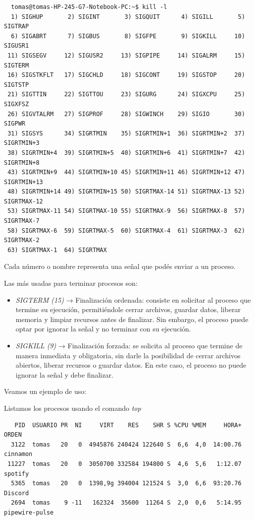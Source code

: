 \documentclass{article}
\begin{document}
\begin{commandline}
 {
\begin{verbatim}
  tomas@tomas-HP-245-G7-Notebook-PC:~$ kill -l
  1) SIGHUP       2) SIGINT       3) SIGQUIT      4) SIGILL       5) SIGTRAP 
  6) SIGABRT      7) SIGBUS       8) SIGFPE       9) SIGKILL     10) SIGUSR1
 11) SIGSEGV     12) SIGUSR2     13) SIGPIPE     14) SIGALRM     15) SIGTERM
 16) SIGSTKFLT   17) SIGCHLD     18) SIGCONT     19) SIGSTOP     20) SIGTSTP
 21) SIGTTIN     22) SIGTTOU     23) SIGURG      24) SIGXCPU     25) SIGXFSZ
 26) SIGVTALRM   27) SIGPROF     28) SIGWINCH    29) SIGIO       30) SIGPWR   
 31) SIGSYS      34) SIGRTMIN    35) SIGRTMIN+1  36) SIGRTMIN+2  37) SIGRTMIN+3 
 38) SIGRTMIN+4  39) SIGRTMIN+5  40) SIGRTMIN+6  41) SIGRTMIN+7  42) SIGRTMIN+8 
 43) SIGRTMIN+9  44) SIGRTMIN+10 45) SIGRTMIN+11 46) SIGRTMIN+12 47) SIGRTMIN+13 
 48) SIGRTMIN+14 49) SIGRTMIN+15 50) SIGRTMAX-14 51) SIGRTMAX-13 52) SIGRTMAX-12 
 53) SIGRTMAX-11 54) SIGRTMAX-10 55) SIGRTMAX-9  56) SIGRTMAX-8  57) SIGRTMAX-7 
 58) SIGRTMAX-6  59) SIGRTMAX-5  60) SIGRTMAX-4  61) SIGRTMAX-3  62) SIGRTMAX-2 
 63) SIGRTMAX-1  64) SIGRTMAX
\end{verbatim}
}
\end{commandline}

\noindent
Cada número o nombre representa una señal que podés enviar a un proceso.

\noindent
Las más usadas para terminar procesos son:

\begin{itemize}
  \item \textit{SIGTERM (15)} → Finalización ordenada: consiste en solicitar al proceso que termine su ejecución, 
  permitiéndole cerrar archivos, guardar datos, liberar memoria y limpiar recursos antes de finalizar. Sin embargo, el proceso 
  puede optar por ignorar la señal y no terminar con su ejecución.
  \item \textit{SIGKILL (9)} → Finalización forzada: se solicita al proceso que termine de manera inmediata y obligatoria,
  sin darle la posibilidad de cerrar archivos abiertos, liberar recursos o guardar datos. En este caso, el proceso no puede 
  ignorar la señal y debe finalizar.
\end{itemize}

\noindent
Veamos un ejemplo de uso:

\bigbreak\noindent
Listamos los procesos usando el comando \textit{top}
   
\begin{commandline}
 {
\begin{verbatim}
   PID  USUARIO PR  NI     VIRT    RES    SHR S %CPU %MEM     HORA+ ORDEN
  3122  tomas   20   0  4945876 240424 122640 S  6,6  4,0  14:00.76 cinnamon
 11227  tomas   20   0  3050700 332584 194800 S  4,6  5,6   1:12.07 spotify
  5365  tomas   20   0  1398,9g 394004 121524 S  3,0  6,6  93:20.76 Discord
  2694  tomas    9 -11   162324  35600  11264 S  2,0  0,6   5:14.95 pipewire-pulse
\end{verbatim}
}
\end{commandline}
\end{document}
